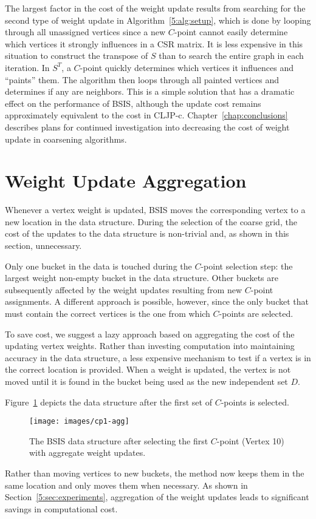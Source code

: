 \documentclass{elsart}
\begin{document}
The largest factor in the cost of the weight update results from
searching for the second type of weight update in
Algorithm~\ref{5:alg:setup}, which is done by looping through all
unassigned vertices since a new $C$-point cannot easily determine
which vertices it strongly influences in a CSR matrix. It is less
expensive in this situation to construct the transpose of $S$ than to
search the entire graph in each iteration. In $S^T$, a $C$-point
quickly determines which vertices it influences and ``paints''
them. The algorithm then loops through all painted vertices and
determines if any are neighbors. This is a simple solution that has a
dramatic effect on the performance of BSIS, although the update cost
remains approximately equivalent to the cost in
CLJP-c. Chapter~\ref{chap:conclusions} describes plans for continued
investigation into decreasing the cost of weight update in coarsening
algorithms.

\section{Weight Update Aggregation}
\label{5:sec:agg}
Whenever a vertex weight is updated, BSIS moves the corresponding
vertex to a new location in the data structure. During the selection
of the coarse grid, the cost of the updates to the data structure is
non-trivial and, as shown in this section, unnecessary.

Only one bucket in the data is touched during the $C$-point selection
step: the largest weight non-empty bucket in the data structure. Other
buckets are subsequently affected by the weight updates resulting from
new $C$-point assignments. A different approach is possible, however,
since the only bucket that must contain the correct vertices is the
one from which $C$-points are selected.

To save cost, we suggest a lazy approach based on aggregating the cost
of the updating vertex weights. Rather than investing computation into
maintaining accuracy in the data structure, a less expensive mechanism
to test if a vertex is in the correct location is provided. When a
weight is updated, the vertex is not moved until it is found in the
bucket being used as the new independent set $D$.

Figure~\ref{5:fig:cp1-agg} depicts the data structure after the first
set of $C$-points is selected.
\begin{figure}
  \begin{center}
    \texttt{[image: images/cp1-agg]}
    \caption{The BSIS data structure after selecting the first
    $C$-point (Vertex 10) with aggregate weight updates.}
    \label{5:fig:cp1-agg}
  \end{center}
\end{figure}
Rather than moving vertices to new buckets, the method now keeps them
in the same location and only moves them when necessary. As shown in
Section~\ref{5:sec:experiments}, aggregation of the weight updates
leads to significant savings in computational cost.
\end{document}

